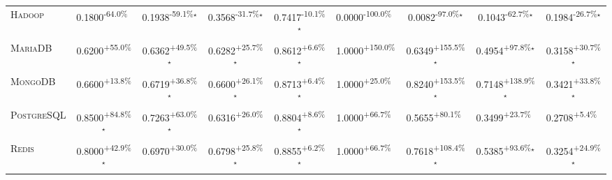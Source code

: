 \begin{table}[htbp]
\begin{tabular}{l|cccc|cccc}
\textsc{Hadoop} & \cellcolor{red!30}0.1800\textsuperscript{-64.0\%}$^{\,\,\,}$ & \cellcolor{red!30}0.1938\textsuperscript{-59.1\%}$^\star$ & \cellcolor{red!30}0.3568\textsuperscript{-31.7\%}$^\star$ & \cellcolor{red!30}0.7417\textsuperscript{-10.1\%}$^\star$ & \cellcolor{red!30}0.0000\textsuperscript{-100.0\%}$^{\,\,\,}$ & \cellcolor{red!30}0.0082\textsuperscript{-97.0\%}$^\star$ & \cellcolor{red!30}0.1043\textsuperscript{-62.7\%}$^\star$ & \cellcolor{red!30}0.1984\textsuperscript{-26.7\%}$^\star$ \\
\textsc{MariaDB} & \cellcolor{green!30}0.6200\textsuperscript{+55.0\%}$^{\,\,\,}$ & \cellcolor{green!30}0.6362\textsuperscript{+49.5\%}$^\star$ & \cellcolor{green!30}0.6282\textsuperscript{+25.7\%}$^\star$ & \cellcolor{green!30}0.8612\textsuperscript{+6.6\%}$^\star$ & \cellcolor{green!30}1.0000\textsuperscript{+150.0\%}$^{\,\,\,}$ & \cellcolor{green!30}0.6349\textsuperscript{+155.5\%}$^\star$ & \cellcolor{green!30}0.4954\textsuperscript{+97.8\%}$^\star$ & \cellcolor{green!30}0.3158\textsuperscript{+30.7\%}$^\star$ \\
\textsc{MongoDB} & \cellcolor{green!30}0.6600\textsuperscript{+13.8\%}$^{\,\,\,}$ & \cellcolor{green!30}0.6719\textsuperscript{+36.8\%}$^\star$ & \cellcolor{green!30}0.6600\textsuperscript{+26.1\%}$^\star$ & \cellcolor{green!30}0.8713\textsuperscript{+6.4\%}$^\star$ & \cellcolor{green!30}1.0000\textsuperscript{+25.0\%}$^{\,\,\,}$ & \cellcolor{green!30}0.8240\textsuperscript{+153.5\%}$^\star$ & \cellcolor{green!30}0.7148\textsuperscript{+138.9\%}$^\star$ & \cellcolor{green!30}0.3421\textsuperscript{+33.8\%}$^\star$ \\
\textsc{PostgreSQL} & \cellcolor{green!30}0.8500\textsuperscript{+84.8\%}$^\star$ & \cellcolor{green!30}0.7263\textsuperscript{+63.0\%}$^\star$ & \cellcolor{green!30}0.6316\textsuperscript{+26.0\%}$^{\,\,\,}$ & \cellcolor{green!30}0.8804\textsuperscript{+8.6\%}$^\star$ & \cellcolor{green!30}1.0000\textsuperscript{+66.7\%}$^{\,\,\,}$ & \cellcolor{green!30}0.5655\textsuperscript{+80.1\%}$^{\,\,\,}$ & \cellcolor{green!30}0.3499\textsuperscript{+23.7\%}$^{\,\,\,}$ & \cellcolor{green!30}0.2708\textsuperscript{+5.4\%}$^{\,\,\,}$ \\
\textsc{Redis} & \cellcolor{green!30}0.8000\textsuperscript{+42.9\%}$^\star$ & \cellcolor{green!30}0.6970\textsuperscript{+30.0\%}$^{\,\,\,}$ & \cellcolor{green!30}0.6798\textsuperscript{+25.8\%}$^\star$ & \cellcolor{green!30}0.8855\textsuperscript{+6.2\%}$^\star$ & \cellcolor{green!30}1.0000\textsuperscript{+66.7\%}$^{\,\,\,}$ & \cellcolor{green!30}0.7618\textsuperscript{+108.4\%}$^\star$ & \cellcolor{green!30}0.5385\textsuperscript{+93.6\%}$^\star$ & \cellcolor{green!30}0.3254\textsuperscript{+24.9\%}$^\star$ \\

\end{tabular}
\end{table}
